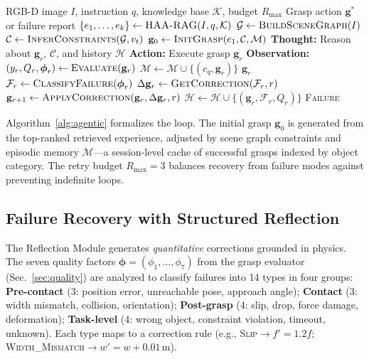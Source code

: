 \documentclass[letterpaper, 10pt, conference]{ieeeconf}
\begin{document}
\begin{algorithm}[t]
\caption{Agentic Self-Reflective Grasp Planning}
\label{alg:agentic}
\begin{algorithmic}[1]
\REQUIRE RGB-D image $I$, instruction $q$, knowledge base $\mathcal{K}$, budget $R_{\max}$
\ENSURE Grasp action $\mathbf{g}^*$ or failure report
\STATE $\{e_1, \dots, e_k\} \leftarrow \textsc{HAA-RAG}(I, q, \mathcal{K})$ 
\STATE $\mathcal{G} \leftarrow \textsc{BuildSceneGraph}(I)$ 
\STATE $\mathcal{C} \leftarrow \textsc{InferConstraints}(\mathcal{G}, v_t)$ 
\STATE $\mathbf{g}_0 \leftarrow \textsc{InitGrasp}(e_1, \mathcal{C}, \mathcal{M})$ 
    \STATE \textbf{Thought:} Reason about $\mathbf{g}_r$, $\mathcal{C}$, and history $\mathcal{H}$
    \STATE \textbf{Action:} Execute grasp $\mathbf{g}_r$
    \STATE \textbf{Observation:} $(y_r, Q_r, \boldsymbol{\phi}_r) \leftarrow \textsc{Evaluate}(\mathbf{g}_r)$
        \STATE $\mathcal{M} \leftarrow \mathcal{M} \cup \{(c_q, \mathbf{g}_r)\}$ 
        \RETURN $\mathbf{g}_r$
    \ENDIF
    \STATE $\mathcal{F}_r \leftarrow \textsc{ClassifyFailure}(\boldsymbol{\phi}_r)$ 
    \STATE $\Delta\mathbf{g}_r \leftarrow \textsc{GetCorrection}(\mathcal{F}_r, r)$ 
    \STATE $\mathbf{g}_{r+1} \leftarrow \textsc{ApplyCorrection}(\mathbf{g}_r, \Delta\mathbf{g}_r, r)$
    \STATE $\mathcal{H} \leftarrow \mathcal{H} \cup \{(\mathbf{g}_r, \mathcal{F}_r, Q_r)\}$ 
\ENDFOR
\RETURN \textsc{Failure}
\end{algorithmic}
\end{algorithm}

Algorithm~\ref{alg:agentic} formalizes the loop.
The initial grasp $\mathbf{g}_0$ is generated from the top-ranked retrieved experience, adjusted by scene graph constraints and episodic memory $\mathcal{M}$---a session-level cache of successful grasps indexed by object category.
The retry budget $R_{\max} = 3$ balances recovery from failure modes against preventing indefinite loops.

\subsection{Failure Recovery with Structured Reflection}
\label{sec:failure}

The Reflection Module generates \emph{quantitative} corrections grounded in physics.
The seven quality factors $\boldsymbol{\phi} = (\phi_1, \dots, \phi_7)$ from the grasp evaluator (Sec.~\ref{sec:quality}) are analyzed to classify failures into 14 types in four groups:
\textbf{Pre-contact} (3: position error, unreachable pose, approach angle);
\textbf{Contact} (3: width mismatch, collision, orientation);
\textbf{Post-grasp} (4: slip, drop, force damage, deformation);
\textbf{Task-level} (4: wrong object, constraint violation, timeout, unknown).
Each type maps to a correction rule (e.g., \textsc{Slip}$\rightarrow$$f'{=}1.2f$; \textsc{Width\_Mismatch}$\rightarrow$$w'{=}w{+}0.01$\,m).
\end{document}
